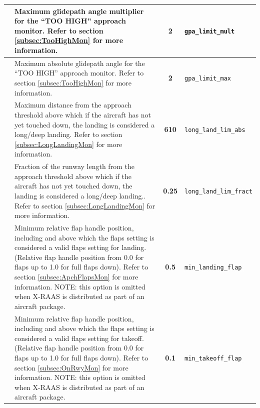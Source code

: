 \documentclass[a4paper,12pt]{article}
\newcommand{\confopt}[1]{\texttt{#1}}
\begin{document}
{\begin{center}
\begin{supertabular}{|c|p{8cm}|c|l|}
 &
Maximum glidepath angle multiplier for the ``TOO HIGH'' approach
monitor.\newline
Refer to section \ref{subsec:TooHighMon} for more information. &
\textbf{2} & \confopt{gpa\_limit\_mult} \\

\hline

 &
Maximum absolute glidepath angle for the ``TOO HIGH'' approach
monitor.\newline
Refer to section \ref{subsec:TooHighMon} for more information. &
\textbf{2} & \confopt{gpa\_limit\_max} \\

\hline

 &
Maximum distance from the approach threshold above which if the aircraft
has not yet touched down, the landing is considered a long/deep
landing.\newline
Refer to section \ref{subsec:LongLandingMon} for more information. &
\textbf{610} & \confopt{long\_land\_lim\_abs} \\

\hline

 &
Fraction of the runway length from the approach threshold above which if
the aircraft has not yet touched down, the landing is considered a
long/deep landing..\newline
Refer to section \ref{subsec:LongLandingMon} for more information. &
\textbf{0.25} & \confopt{long\_land\_lim\_fract} \\

\hline

 &
Minimum relative flap handle position, including and above which the
flaps setting is considered a valid flaps setting for landing.\newline
(Relative flap handle position from 0.0 for flaps up to 1.0 for full flaps down).\newline
Refer to section \ref{subsec:ApchFlapsMon} for more information.\newline
NOTE: this option is omitted when X-RAAS is distributed as part of an
aircraft package. &
\textbf{0.5} & \confopt{min\_landing\_flap} \\

\hline

 &
Minimum relative flap handle position, including and above which the
flaps setting is considered a valid flaps setting for takeoff.\newline
(Relative flap handle position from 0.0 for flaps up to 1.0 for full flaps down).\newline
Refer to section \ref{subsec:OnRwyMon} for more information.\newline
NOTE: this option is omitted when X-RAAS is distributed as part of an
aircraft package. &
\textbf{0.1} & \confopt{min\_takeoff\_flap} \\


\end{supertabular}
\end{center}}
\end{document}
